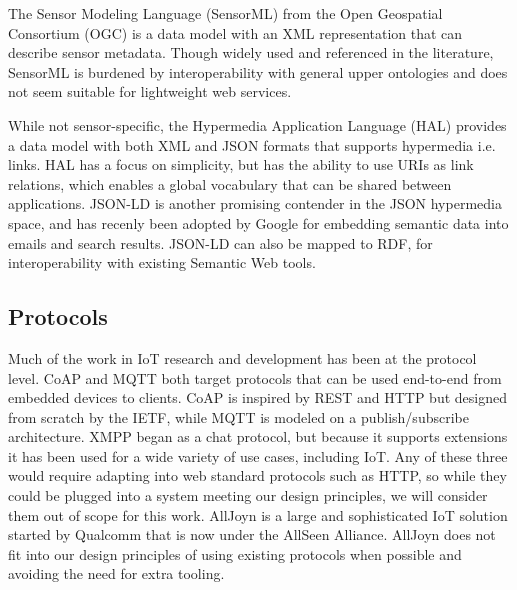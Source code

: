 \documentclass{acm_proc_article-sp}
\begin{document}
The Sensor Modeling Language (SensorML) from the Open Geospatial Consortium
(OGC) is a data model with an XML representation that can describe sensor
metadata. Though widely used and referenced in the literature, SensorML is
burdened by interoperability with general upper ontologies and does not seem
suitable for lightweight web services.

While not sensor-specific, the Hypermedia Application Language (HAL) provides a
data model with both XML and JSON formats that supports hypermedia i.e. links.
HAL has a focus on simplicity, but has the ability to use URIs as link
relations, which enables a global vocabulary that can be shared between
applications. JSON-LD is another promising contender in the JSON hypermedia
space, and has recenly been adopted by Google for embedding semantic data into
emails and search results\cite{sporny_google}. JSON-LD can also be mapped to
RDF, for interoperability with existing Semantic Web tools.

\subsection{Protocols}
Much of the work in IoT research and development has been at the protocol
level. CoAP\cite{coap} and MQTT\cite{mqtt} both target protocols that can be
used end-to-end from embedded devices to clients. CoAP is inspired by REST and
HTTP but designed from scratch by the IETF\cite{californium}, while MQTT is
modeled on a publish/subscribe architecture. XMPP began as a chat protocol, but
because it supports extensions it has been used for a wide variety of use
cases, including IoT. Any of these three would require adapting into web
standard protocols such as HTTP, so while they could be plugged into a system
meeting our design principles, we will consider them out of scope for this
work. AllJoyn is a large and sophisticated IoT solution started by Qualcomm
that is now under the AllSeen Alliance. AllJoyn does not fit into our design
principles of using existing protocols when possible and avoiding the need for
extra tooling.
\end{document}
